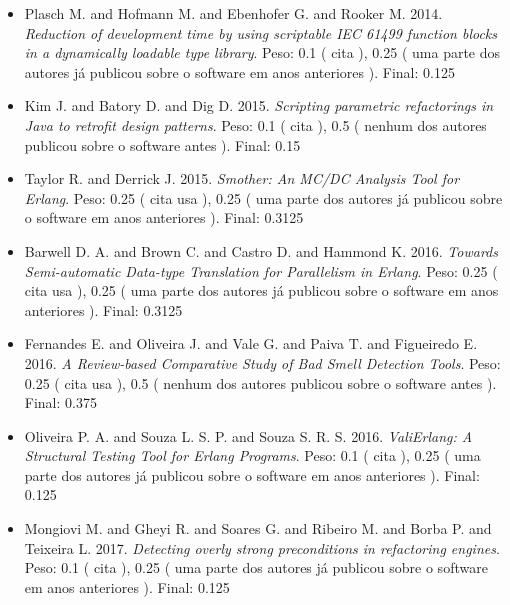 \begin{itemize}
\item Plasch M. and Hofmann M. and Ebenhofer G. and Rooker M.
      2014.
        \textit{ Reduction of development time by using scriptable IEC 61499 function blocks in a dynamically loadable type library}.
      Peso:
      0.1 (
          cita
      ),
      0.25 (
uma parte dos autores já publicou sobre o software em anos anteriores
      ).
      Final:
      0.125

\item Kim J. and Batory D. and Dig D.
      2015.
        \textit{ Scripting parametric refactorings in Java to retrofit design patterns}.
      Peso:
      0.1 (
          cita
      ),
      0.5 (
nenhum dos autores publicou sobre o software antes
      ).
      Final:
      0.15

\item Taylor R. and Derrick J.
      2015.
        \textit{ Smother: An MC/DC Analysis Tool for Erlang}.
      Peso:
      0.25 (
          cita
          usa
      ),
      0.25 (
uma parte dos autores já publicou sobre o software em anos anteriores
      ).
      Final:
      0.3125

\item Barwell D. A. and Brown C. and Castro D. and Hammond K.
      2016.
        \textit{ Towards Semi-automatic Data-type Translation for Parallelism in Erlang}.
      Peso:
      0.25 (
          cita
          usa
      ),
      0.25 (
uma parte dos autores já publicou sobre o software em anos anteriores
      ).
      Final:
      0.3125

\item Fernandes E. and Oliveira J. and Vale G. and Paiva T. and Figueiredo E.
      2016.
        \textit{ A Review-based Comparative Study of Bad Smell Detection Tools}.
      Peso:
      0.25 (
          cita
          usa
      ),
      0.5 (
nenhum dos autores publicou sobre o software antes
      ).
      Final:
      0.375

\item Oliveira P. A. and Souza L. S. P. and Souza S. R. S.
      2016.
        \textit{ ValiErlang: A Structural Testing Tool for Erlang Programs}.
      Peso:
      0.1 (
          cita
      ),
      0.25 (
uma parte dos autores já publicou sobre o software em anos anteriores
      ).
      Final:
      0.125

\item Mongiovi M. and Gheyi R. and Soares G. and Ribeiro M. and Borba P. and Teixeira L.
      2017.
        \textit{ Detecting overly strong preconditions in refactoring engines}.
      Peso:
      0.1 (
          cita
      ),
      0.25 (
uma parte dos autores já publicou sobre o software em anos anteriores
      ).
      Final:
      0.125

\end{itemize}

